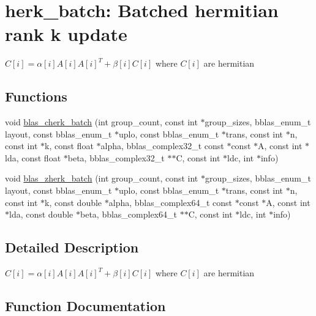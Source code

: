 \hypertarget{group__herk__batch}{}\section{herk\+\_\+batch\+: Batched hermitian rank k update}
\label{group__herk__batch}


$ C[i] = \alpha[i] A[i] A[i]^T + \beta[i] C[i] $ where $ C[i] $ are hermitian  


\subsection*{Functions}
\begin{DoxyCompactItemize}
\item 
void \mbox{\hyperlink{group__herk__batch_gabb4f6700925dbe222f5050d776de2629}{blas\+\_\+cherk\+\_\+batch}} (int group\+\_\+count, const int $\ast$group\+\_\+sizes, bblas\+\_\+enum\+\_\+t layout, const bblas\+\_\+enum\+\_\+t $\ast$uplo, const bblas\+\_\+enum\+\_\+t $\ast$trans, const int $\ast$n, const int $\ast$k, const float $\ast$alpha, bblas\+\_\+complex32\+\_\+t const $\ast$const $\ast$A, const int $\ast$lda, const float $\ast$beta, bblas\+\_\+complex32\+\_\+t $\ast$$\ast$C, const int $\ast$ldc, int $\ast$info)
\item 
void \mbox{\hyperlink{group__herk__batch_ga5623b4820ae30bfd3aef08b48491659b}{blas\+\_\+zherk\+\_\+batch}} (int group\+\_\+count, const int $\ast$group\+\_\+sizes, bblas\+\_\+enum\+\_\+t layout, const bblas\+\_\+enum\+\_\+t $\ast$uplo, const bblas\+\_\+enum\+\_\+t $\ast$trans, const int $\ast$n, const int $\ast$k, const double $\ast$alpha, bblas\+\_\+complex64\+\_\+t const $\ast$const $\ast$A, const int $\ast$lda, const double $\ast$beta, bblas\+\_\+complex64\+\_\+t $\ast$$\ast$C, const int $\ast$ldc, int $\ast$info)
\end{DoxyCompactItemize}


\subsection{Detailed Description}
$ C[i] = \alpha[i] A[i] A[i]^T + \beta[i] C[i] $ where $ C[i] $ are hermitian 



\subsection{Function Documentation}
\mbox{\label{group__herk__batch_gabb4f6700925dbe222f5050d776de2629}} 
